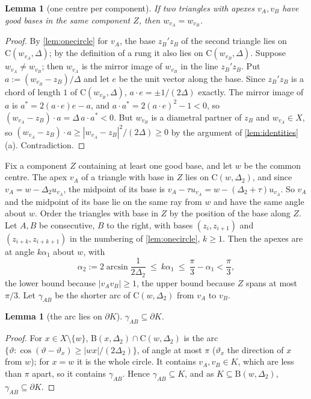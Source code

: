 \documentclass[11pt]{amsart}
\newtheorem{lemma}[theorem]{Lemma}
\theoremstyle{definition}
\theoremstyle{remark}
\newcommand{\Dt}{\Delta_2}
\newcommand{\Cc}{\mathrm{C}}      %
\newcommand{\Dd}{\mathrm{B}}      %
\begin{document}
\begin{lemma}[one centre per component]\label{lem:onecentre}
If two triangles with apexes $v_A,v_B$ have good bases in the same component $Z$, then $w_{v_A}=w_{v_B}$.
\end{lemma}
\begin{proof}
By \cref{lem:onecircle} for $v_A$, the base $z_B'z_B$ of the second triangle lies on $\Cc(w_{v_A},\Delta)$; by the definition of a rung it also lies on $\Cc(w_{v_B},\Delta)$. Suppose $w_{v_A}\ne w_{v_B}$; then $w_{v_A}$ is the mirror image of $w_{v_B}$ in the line $z_B'z_B$. Put $a:=(w_{v_B}-z_B)/\Delta$ and let $e$ be the unit vector along the base. Since $z_B'z_B$ is a chord of length $1$ of $\Cc(w_{v_B},\Delta)$, $a\cdot e=\pm1/(2\Delta)$ exactly. The mirror image of $a$ is $a^*=2(a\cdot e)e-a$, and $a\cdot a^*=2(a\cdot e)^2-1<0$, so $(w_{v_A}-z_B)\cdot a=\Delta\,a\cdot a^*<0$. But $w_{v_B}$ is a diametral partner of $z_B$ and $w_{v_A}\in X$, so $(w_{v_A}-z_B)\cdot a\ge|w_{v_A}-z_B|^2/(2\Delta)\ge0$ by the argument of \cref{lem:identities}(a). Contradiction.
\end{proof}

Fix a component $Z$ containing at least one good base, and let $w$ be the common centre. The apex $v_A$ of a triangle with base in $Z$ lies on $\Cc(w,\Dt)$, and since $v_A=w-\Dt u_{v_A}$, the midpoint of its base is $v_A-\tau u_{v_A}=w-(\Dt+\tau)u_{v_A}$. So $v_A$ and the midpoint of its base lie on the same ray from $w$ and have the same angle about $w$. Order the triangles with base in $Z$ by the position of the base along $Z$. Let $A,B$ be consecutive, $B$ to the right, with bases $(z_i,z_{i+1})$ and $(z_{i+k},z_{i+k+1})$ in the numbering of \cref{lem:onecircle}, $k\ge1$. Then the apexes are at angle $k\alpha_1$ about $w$, with
\begin{equation}\label{eq:kalpha}
\alpha_2:=2\arcsin\frac1{2\Dt}\ \le\ k\alpha_1\ \le\ \frac\pi3-\alpha_1<\frac\pi3,
\end{equation}
the lower bound because $|v_Av_B|\ge1$, the upper bound because $Z$ spans at most $\pi/3$. Let $\gamma_{AB}$ be the shorter arc of $\Cc(w,\Dt)$ from $v_A$ to $v_B$.

\begin{lemma}[the arc lies on $\partial K$]\label{lem:arcK}
$\gamma_{AB}\subseteq\partial K$.
\end{lemma}
\begin{proof}
For $x\in X\setminus\{w\}$, $\Dd(x,\Dt)\cap\Cc(w,\Dt)$ is the arc $\{\vartheta:\cos(\vartheta-\vartheta_x)\ge|wx|/(2\Dt)\}$, of angle at most $\pi$ ($\vartheta_x$ the direction of $x$ from $w$); for $x=w$ it is the whole circle. It contains $v_A,v_B\in K$, which are less than $\pi$ apart, so it contains $\gamma_{AB}$. Hence $\gamma_{AB}\subseteq K$, and as $K\subseteq\Dd(w,\Dt)$, $\gamma_{AB}\subseteq\partial K$.
\end{proof}
\end{document}

